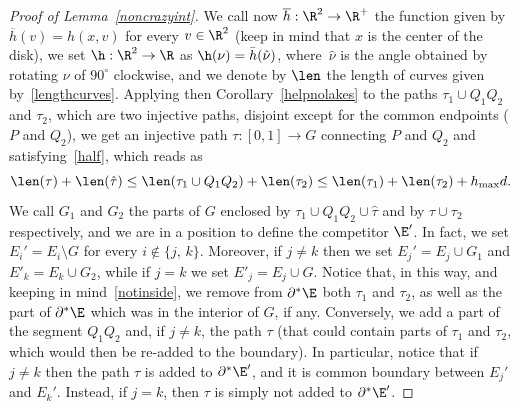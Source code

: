 \begin{proof}[Proof of Lemma~\ref{noncrazyint}]
We call now $\overline h:\R^2\to\R^+$ the function given by $\overline h(v)=h(x,v)$ for every $v\in\R^2$ (keep in mind that $x$ is the center of the disk), we set $\h:\R^2\to\R$ as $\h(\nu)=\bar h(\hat \nu)$, where~$\hat \nu$ is the angle obtained by rotating $\nu$ of $90^\circ$ clockwise, and we denote by $\len$ the length of curves given by~\eqref{lengthcurves}. Applying then Corollary~\ref{helpnolakes} to the paths $\tau_1\cup Q_1Q_2$ and $\tau_2$, which are two injective paths, disjoint except for the common endpoints (\ie $P$ and $Q_2$), we get an injective path $\tau:[0,1]\to G$ connecting $P$ and $Q_2$ and satisfying~\eqref{half}, which reads as
\begin{equation}\label{halfthistime}
\len(\tau) + \len(\hat\tau) \leq \len(\tau_1\cup Q_1Q_2)+\len(\tau_2)
\leq \len(\tau_1)+\len(\tau_2)+h_{\max}d.
\end{equation}
We call $G_1$ and $G_2$ the parts of $G$ enclosed by $\tau_1\cup Q_1Q_2\cup \hat\tau$ and by $\tau\cup\tau_2$ respectively, and we are in a position to define the competitor $\E'$. In fact, we set $E_i'= E_i\setminus G$ for every $i\notin \{j,\,k\}$. Moreover, if $j\neq k$ then we set $E_j'=E_j \cup G_1$ and $E'_k=E_k \cup G_2$, while if $j=k$ we set $E'_j = E_j \cup G$. Notice that, in this way, and keeping in mind~\eqref{notinside}, we remove from $\partial^*\E$ both $\tau_1$ and $\tau_2$, as well as the part of $\partial^*\E$ which was in the interior of $G$, if any. Conversely, we add a part of the segment $Q_1Q_2$ and, if $j\neq k$, the path $\tau$ (that could contain parts of $\tau_1$ and $\tau_2$, which would then be re-added to the boundary). In particular, notice that if $j\neq k$ then the path $\tau$ is added to $\partial^*\E'$, and it is common boundary between $E_j'$ and $E_k'$. Instead, if $j=k$, then $\tau$ is simply not added to $\partial^*\E'$.


\end{proof}
